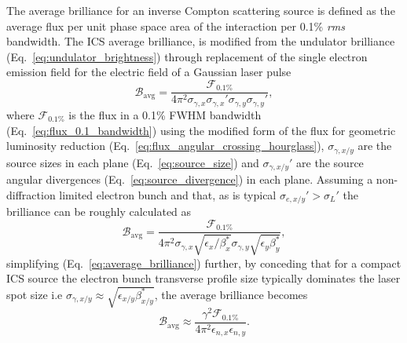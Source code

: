 \documentclass[../main.tex]{subfiles}
\begin{document}
The average brilliance for an inverse Compton scattering source is defined as the average flux per unit phase space area of the interaction per 0.1\% \textit{rms} bandwidth. The ICS average brilliance, is modified from the undulator brilliance (Eq.~\ref{eq:undulator_brightness}) through replacement of the single electron emission field for the electric field of a Gaussian laser pulse \cite{krafft2010compton,deitrick2018high}
\begin{equation}
\mathcal{B}_{\mathrm{avg}} = \frac{\mathcal{F}_{0.1\%}}{4\pi^{2}\sigma_{\gamma,x}\sigma_{\gamma,x}'\sigma_{\gamma,y}\sigma_{\gamma,y}'},
\label{eq:average_brilliance}
\end{equation}
where $\mathcal{F}_{0.1\%}$ is the flux in a 0.1\% FWHM bandwidth (Eq.~\ref{eq:flux_0.1_bandwidth}) using the modified form of the flux for geometric luminosity reduction (Eq.~\ref{eq:flux_angular_crossing_hourglass}), $\sigma_{\gamma,x/y}$ are the source sizes in each plane (Eq.~\ref{eq:source_size}) and $\sigma_{\gamma,x/y}'$ are the source angular divergences (Eq.~\ref{eq:source_divergence}) in each plane. Assuming a non-diffraction limited electron bunch and that, as is typical $\sigma_{e,x/y}' > \sigma_{L}'$ the brilliance can be roughly calculated as
\begin{equation}
\mathcal{B}_{\mathrm{avg}} = \frac{\mathcal{F}_{0.1\%}}{4\pi^{2}\sigma_{\gamma,x}\sqrt{\epsilon_{x}/\beta_{x}^{*}}\sigma_{\gamma,y}\sqrt{\epsilon_{y}\beta_{y}^{*}}},
\label{eq:average_brilliance_nondiffraction}    
\end{equation}
simplifying (Eq.~\ref{eq:average_brilliance}) further, by conceding that for a compact ICS source the electron bunch transverse profile size typically dominates the laser spot size i.e $\sigma_{\gamma,x/y} \approx \sqrt{\epsilon_{x/y}\beta_{x/y}^{*}}$, the average brilliance becomes
\begin{equation}
\mathcal{B}_{\mathrm{avg}} \approx \frac{\gamma^{2}\mathcal{F}_{0.1\%}}{4\pi^{2}\epsilon_{n,x}\epsilon_{n,y}}.
\label{eq:average_brilliance_compact}    
\end{equation}
\end{document}
